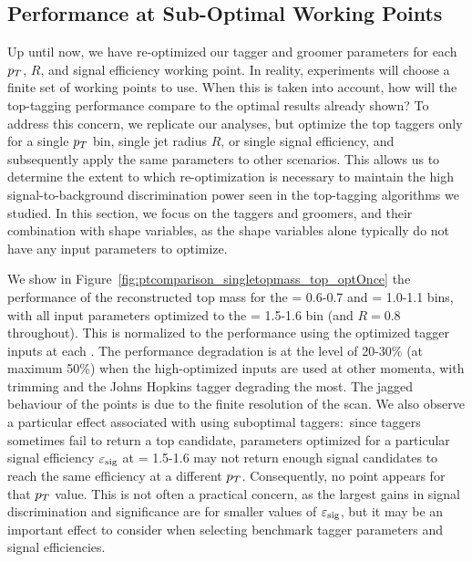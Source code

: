\subsection{Performance at Sub-Optimal Working Points}

Up until now, we have re-optimized our tagger and groomer parameters for each $p_T$, $R$, and signal efficiency working point. In reality, experiments will choose a finite set of working points to use. When this is taken into account, how will the top-tagging performance compare to the optimal results already shown? To address this concern, we replicate our analyses, but optimize the top taggers only for a single $p_T$ bin, single jet radius $R$, or single signal efficiency, and subsequently apply the same parameters to other scenarios. This allows us to determine the extent to which re-optimization is necessary to maintain the high signal-to-background discrimination power seen in the top-tagging algorithms we studied. In this section, we focus on the taggers and groomers, and their combination with shape variables, as the shape variables alone typically do not have any input parameters to optimize.

We show in Figure~\ref{fig:ptcomparison_singletopmass_top_optOnce} the performance of the reconstructed top mass for the \pt = 0.6-0.7 \TeV and \pt = 1.0-1.1 \TeV bins, with all input parameters optimized to the \pt = 1.5-1.6 \TeV bin (and $R=0.8$ throughout). This is normalized to the performance using the optimized tagger inputs at each \pt. The performance degradation is at the level of 20-30\% (at maximum 50\%) when the high-\pt optimized inputs are used at other momenta,
with trimming and the Johns Hopkins tagger degrading the most. The jagged behaviour of the points is due to the finite resolution of the scan. We also observe a particular effect associated with using suboptimal taggers:~since taggers sometimes fail to return a top candidate, parameters optimized for a particular signal efficiency $\varepsilon_{\rm sig}$ at \pt = 1.5-1.6 \TeV may not return enough signal candidates to reach the same efficiency at a different $p_T$. Consequently, no point appears for that $p_T$ value. This is not often a practical concern, as the largest gains in signal discrimination and significance are for smaller values of $\varepsilon_{\rm sig}$, but it may be an important effect to consider when selecting benchmark tagger parameters and signal efficiencies.

